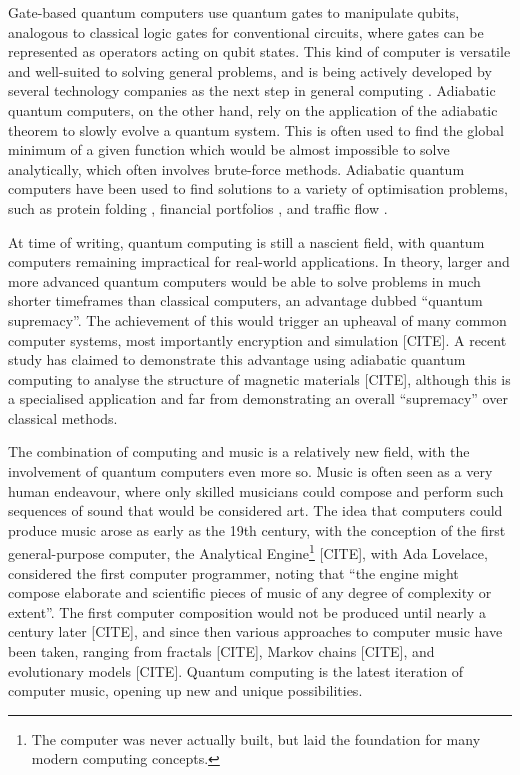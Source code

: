 \documentclass[12pt]{article}
\theoremstyle{definition}
\begin{document}
Gate-based quantum computers use quantum gates to manipulate qubits, analogous to classical logic gates for conventional circuits, where gates can be represented as operators acting on qubit states. This kind of computer is versatile and well-suited to solving general problems, and is being actively developed by several technology companies as the next step in general computing \cite{google}\cite{ibm}.
Adiabatic quantum computers, on the other hand, rely on the application of the adiabatic theorem to slowly evolve a quantum system. This is often used to find the global minimum of a given function which would be almost impossible to solve analytically, which often involves brute-force methods. Adiabatic quantum computers have been used to find solutions to a variety of optimisation problems, such as protein folding \cite{perdomo-ortiz_protein_2012}, financial portfolios \cite{phillipson_portfolio_2021}, and traffic flow \cite{inoue_traffic_2021}.

At time of writing, quantum computing is still a nascient field, with quantum computers remaining impractical for real-world applications. In theory, larger and more advanced quantum computers would be able to solve problems in much shorter timeframes than classical computers, an advantage dubbed ``quantum supremacy''. The achievement of this would trigger an upheaval of many common computer systems, most importantly encryption and simulation [CITE]. A recent study has claimed to demonstrate this advantage using adiabatic quantum computing to analyse the structure of magnetic materials [CITE], although this is a specialised application and far from demonstrating an overall ``supremacy'' over classical methods.

The combination of computing and music is a relatively new field, with the involvement of quantum computers even more so. Music is often seen as a very human endeavour, where only skilled musicians could compose and perform such sequences of sound that would be considered art. The idea that computers could produce music arose as early as the 19th century, with the conception of the first general-purpose computer, the Analytical Engine\footnote{The computer was never actually built, but laid the foundation for many modern computing concepts.} [CITE], with Ada Lovelace, considered the first computer programmer, noting that ``the engine might compose elaborate and scientific pieces of music of any degree
of complexity or extent''. The first computer composition would not be produced until nearly a century later [CITE], and since then various approaches to computer music have been taken, ranging from fractals [CITE], Markov chains [CITE], and evolutionary models [CITE]. Quantum computing is the latest iteration of computer music, opening up new and unique possibilities.
\end{document}
